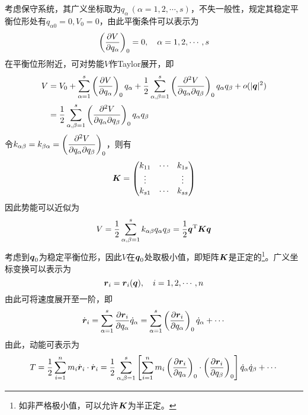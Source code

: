考虑保守系统，其广义坐标取为$q_\alpha\,(\alpha=1,2,\cdots,s)$，不失一般性，规定其稳定平衡位形处有$q_{\alpha 0} = 0,V_0 = 0$，由此平衡条件可以表示为
\begin{equation*}
	\left(\frac{\partial V}{\partial q_\alpha}\right)_0 = 0,\quad \alpha = 1,2,\cdots,s
\end{equation*}
在平衡位形附近，可对势能$V$作Taylor展开，即
\begin{align*}
	V & = V_0 + \sum_{\alpha=1}^s \left(\dfrac{\partial V}{\partial q_\alpha}\right)_0 q_\alpha + \frac12 \sum_{\alpha,\beta=1}^s \left(\frac{\partial^2 V}{\partial q_\alpha \partial q_\beta}\right)_0 q_\alpha q_\beta + o(|\boldsymbol{q}|^2) \\
	& = \frac12 \sum_{\alpha,\beta=1}^s \left(\frac{\partial^2 V}{\partial q_\alpha \partial q_\beta}\right)_0 q_\alpha q_\beta
\end{align*}
令$k_{\alpha\beta} = k_{\beta\alpha} = \left(\dfrac{\partial^2 V}{\partial q_\alpha \partial q_\beta}\right)_0$，则有
\begin{equation*}
	\boldsymbol{K} = \begin{pmatrix} k_{11} & \cdots & k_{1s} \\ \vdots & & \vdots \\ k_{s1} & \cdots & k_{ss} \end{pmatrix}
\end{equation*}
因此势能可以近似为
\begin{equation}
	V = \frac12 \sum_{\alpha,\beta=1}^s k_{\alpha\beta}q_\alpha q_\beta = \frac12 \boldsymbol{q}^{\mathrm{T}} \boldsymbol{K} \boldsymbol{q}
\end{equation}
考虑到$\boldsymbol{q}_0$为稳定平衡位形，因此$V$在$\boldsymbol{q}_0$处取极小值，即矩阵$\boldsymbol{K}$是正定的\footnote{如非严格极小值，可以允许$\boldsymbol{K}$为半正定。}。广义坐标变换可以表示为
\begin{equation*}
	\boldsymbol{r}_i = \boldsymbol{r}_i(\boldsymbol{q}),\quad i=1,2,\cdots,n
\end{equation*}
由此可将速度展开至一阶，即
\begin{equation*}
	\dot{\boldsymbol{r}}_i = \sum_{\alpha=1}^s \frac{\partial \boldsymbol{r}_i}{\partial q_\alpha} \dot{q}_\alpha = \sum_{\alpha=1}^s \left(\frac{\partial \boldsymbol{r}_i}{\partial q_\alpha}\right)_0 \dot{q}_\alpha + \cdots
\end{equation*}
由此，动能可表示为
\begin{equation*}
	T = \frac12 \sum_{i=1}^n m_i \dot{\boldsymbol{r}}_i \cdot \dot{\boldsymbol{r}}_i = \frac12 \sum_{\alpha,\beta=1}^s \left[\sum_{i=1}^n m_i \left(\frac{\partial \boldsymbol{r}_i}{\partial q_\alpha}\right)_0 \cdot \left(\frac{\partial \boldsymbol{r}_i}{\partial q_\beta}\right)_0 \right] \dot{q}_\alpha \dot{q}_\beta + \cdots
\end{equation*}
